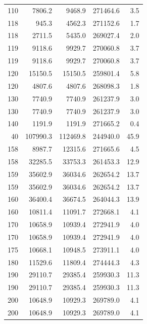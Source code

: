 \begin{longtable}{rrrrr}
    110 & \num{7806.2} & \num{9468.9} & \num{271464.6} & 3.5 \\
    118 & \num{945.3} & \num{4562.3} & \num{271152.6} & 1.7 \\
    118 & \num{2711.5} & \num{5435.0} & \num{269027.4} & 2.0 \\
    119 & \num{9118.6} & \num{9929.7} & \num{270060.8} & 3.7 \\
    119 & \num{9118.6} & \num{9929.7} & \num{270060.8} & 3.7 \\
    120 & \num{15150.5} & \num{15150.5} & \num{259801.4} & 5.8 \\
    120 & \num{4807.6} & \num{4807.6} & \num{268098.3} & 1.8 \\
    130 & \num{7740.9} & \num{7740.9} & \num{261237.9} & 3.0 \\
    130 & \num{7740.9} & \num{7740.9} & \num{261237.9} & 3.0 \\
    140 & \num{1191.9} & \num{1191.9} & \num{271665.2} & 0.4 \\
    40 & \num{107990.3} & \num{112469.8} & \num{244940.0} & 45.9 \\
    158 & \num{8987.7} & \num{12315.6} & \num{271665.6} & 4.5 \\
    158 & \num{32285.5} & \num{33753.3} & \num{261453.3} & 12.9 \\
    159 & \num{35602.9} & \num{36034.6} & \num{262654.2} & 13.7 \\
    159 & \num{35602.9} & \num{36034.6} & \num{262654.2} & 13.7 \\
    160 & \num{36400.4} & \num{36674.5} & \num{264044.3} & 13.9 \\
    160 & \num{10811.4} & \num{11091.7} & \num{272668.1} & 4.1 \\
    170 & \num{10658.9} & \num{10939.4} & \num{272941.9} & 4.0 \\
    170 & \num{10658.9} & \num{10939.4} & \num{272941.9} & 4.0 \\
    175 & \num{10668.1} & \num{10948.5} & \num{273911.1} & 4.0 \\
    180 & \num{11529.6} & \num{11809.4} & \num{274444.3} & 4.3 \\
    190 & \num{29110.7} & \num{29385.4} & \num{259930.3} & 11.3 \\
    190 & \num{29110.7} & \num{29385.4} & \num{259930.3} & 11.3 \\
    200 & \num{10648.9} & \num{10929.3} & \num{269789.0} & 4.1 \\
    200 & \num{10648.9} & \num{10929.3} & \num{269789.0} & 4.1 \\

\end{longtable}
